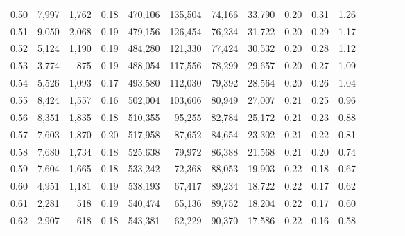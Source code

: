 \begin{tabular}{rrrcrrrrrrrrrrr}
0.50 &   7,997 &  1,762 &                                       0.18 &  470,106 &  135,504 &   74,166 &   33,790 &  0.20 &  0.31 &                         1.26 \\
0.51 &   9,050 &  2,068 &                                       0.19 &  479,156 &  126,454 &   76,234 &   31,722 &  0.20 &  0.29 &                         1.17 \\
0.52 &   5,124 &  1,190 &                                       0.19 &  484,280 &  121,330 &   77,424 &   30,532 &  0.20 &  0.28 &                         1.12 \\
0.53 &   3,774 &    875 &                                       0.19 &  488,054 &  117,556 &   78,299 &   29,657 &  0.20 &  0.27 &                         1.09 \\
0.54 &   5,526 &  1,093 &                                       0.17 &  493,580 &  112,030 &   79,392 &   28,564 &  0.20 &  0.26 &                         1.04 \\
0.55 &   8,424 &  1,557 &                                       0.16 &  502,004 &  103,606 &   80,949 &   27,007 &  0.21 &  0.25 &                         0.96 \\
0.56 &   8,351 &  1,835 &                                       0.18 &  510,355 &   95,255 &   82,784 &   25,172 &  0.21 &  0.23 &                         0.88 \\
0.57 &   7,603 &  1,870 &                                       0.20 &  517,958 &   87,652 &   84,654 &   23,302 &  0.21 &  0.22 &                         0.81 \\
0.58 &   7,680 &  1,734 &                                       0.18 &  525,638 &   79,972 &   86,388 &   21,568 &  0.21 &  0.20 &                         0.74 \\
0.59 &   7,604 &  1,665 &                                       0.18 &  533,242 &   72,368 &   88,053 &   19,903 &  0.22 &  0.18 &                         0.67 \\
0.60 &   4,951 &  1,181 &                                       0.19 &  538,193 &   67,417 &   89,234 &   18,722 &  0.22 &  0.17 &                         0.62 \\
0.61 &   2,281 &    518 &                                       0.19 &  540,474 &   65,136 &   89,752 &   18,204 &  0.22 &  0.17 &                         0.60 \\
0.62 &   2,907 &    618 &                                       0.18 &  543,381 &   62,229 &   90,370 &   17,586 &  0.22 &  0.16 &                         0.58 \\

\end{tabular}
